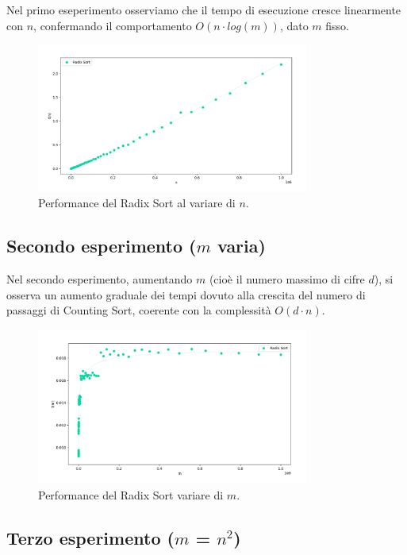 \documentclass[a4paper, 12pt, oneside]{book}
\begin{document}
Nel primo eseperimento osserviamo che il tempo di esecuzione cresce linearmente con \(n\), confermando il comportamento \(O(n \cdot log(m))\), dato \(m\) fisso.

\begin{figure}[H]
    \centering
    \includegraphics[width=0.8\textwidth]{images/grafico_radix_sort_n.png}
    \caption{Performance del Radix Sort al variare di \(n\).}
    \label{fig:radix_sort_way_n}
\end{figure}

\subsection{Secondo esperimento ($m$ varia)}

Nel secondo esperimento, aumentando \(m\) (cioè il numero massimo di cifre \(d\)), si osserva un aumento graduale dei tempi dovuto alla crescita del numero di passaggi di Counting Sort, coerente con la complessità \(O(d \cdot n)\).

\begin{figure}[H]
    \centering
    \includegraphics[width=0.8\textwidth]{images/grafico_radix_sort_m.png}
    \caption{Performance del Radix Sort variare di \(m\).}
    \label{fig:radix_sort_3_way_m}
\end{figure}

\subsection{Terzo esperimento ($m$ = $n^2$)}
\end{document}
